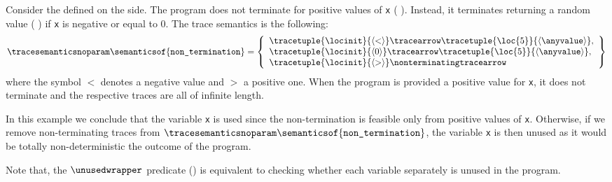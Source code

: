 \begin{example}
  Consider the  defined on the side. The program does not terminate for positive values of \texttt{x} (\cf{} ). Instead, it terminates returning a random value (\cf{} ) if \texttt{x} is negative or equal to $0$. The trace semantics is the following:
  \begin{align*}
    \tracesemanticsnoparam\semanticsof{\texttt{non\_termination}}
    =
    \left\{
    \begin{array}{l}
        \tracetuple{\locinit}{\langle{<}\rangle}\tracearrow\tracetuple{\loc{5}}{\langle{\anyvalue}\rangle}, \\
        \tracetuple{\locinit}{\langle{0}\rangle}\tracearrow\tracetuple{\loc{5}}{\langle{\anyvalue}\rangle}, \\
        \tracetuple{\locinit}{\langle{>}\rangle}\nonterminatingtracearrow\
    \end{array}
    \right\}
  \end{align*}
  where the symbol $<$ denotes a negative value and $>$ a positive one. When the program is provided a positive value for \texttt{x}, it does not terminate and the respective traces are all of infinite length.

  In this example we conclude that the variable \texttt{x} is used since the non-termination is feasible only from positive values of \texttt{x}.
  Otherwise, if we remove non-terminating traces from $\tracesemanticsnoparam\semanticsof{\texttt{non\_termination}}$, the variable \texttt{x} is then unused as it would be totally non-deterministic the outcome of the program.
\end{example}

Note that, the $\unusedwrapper$ predicate () is equivalent to checking whether each variable separately is unused in the program.

